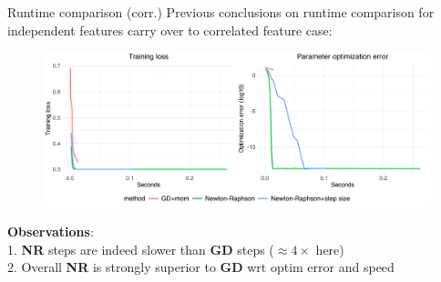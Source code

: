 \documentclass[11pt,compress,t,notes=noshow, xcolor=table]{beamer}
\begin{document}
\begin{vbframe}{Runtime comparison (corr.)}
\vspace{-0.2cm}
Previous conclusions on runtime comparison for independent features carry over to correlated feature case:
\bigskip

\begin{figure}
            \includegraphics[width=1.0\textwidth]{figure_man/simu-newton/NR_GD_runtime_comparison_corr.pdf} \\
\end{figure} 
\vspace{-0.3cm}
\textbf{Observations}:\\ 1. \textbf{NR} steps are indeed slower than \textbf{GD} steps ($\approx 4\times$ here)\\
2. Overall \textbf{NR} is strongly superior to \textbf{GD} wrt optim error and speed\\
\end{vbframe}

\endlecture
\end{document}
